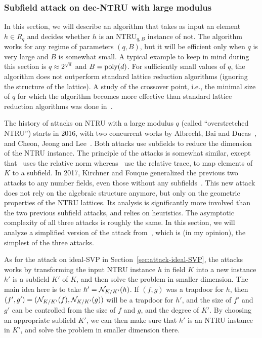 \subsubsection{Subfield attack on dec-NTRU with large modulus}
\label{sec:attack-NTRU}

In this section, we will describe an algorithm that takes as input an element $h \in R_q$ and decides whether $h$ is an NTRU$_{q,B}$ instance of not. The algorithm works for any regime of parameters $(q,B)$, but it will be efficient only when $q$ is very large and $B$ is somewhat small. A typical example to keep in mind during this section is $q \approx 2^{\sqrt{d}}$ and $B = \operatorname{poly}(d)$. For sufficiently small values of $q$, the algorithm does not outperform standard lattice reduction algorithms (ignoring the structure of the lattice). A study of the crossover point, i.e., the minimal size of $q$ for which the algorithm becomes more effective than standard lattice reduction algorithms was done in~\cite{DW21}.

The history of attacks on NTRU with a large modulus $q$ (called ``overstretched NTRU'') starts in 2016, with two concurrent works by Albrecht, Bai and Ducas~\cite{ABD16}, and Cheon, Jeong and Lee~\cite{CJL16}. Both attacks use subfields to reduce the dimension of the NTRU instance. The principle of the attacks is somewhat similar, except that~\cite{ABD16} uses the relative norm whereas~\cite{CJL16} use the relative trace, to map elements of $K$ to a subfield.
In 2017, Kirchner and Fouque generalized the previous two attacks to any number fields, even those without any subfields~\cite{KF17}. This new attack does not rely on the algebraic structure anymore, but only on the geometric properties of the NTRU lattices. Its analysis is significantly more involved than the two previous subfield attacks, and relies on heuristics. The asymptotic complexity of all three attacks is roughly the same.
In this section, we will analyze a simplified version of the attack from~\cite{ABD16}, which is (in my opinion), the simplest of the three attacks.

As for the attack on ideal-SVP in Section~\ref{sec:attack-ideal-SVP}, the attacks works by transforming the input NTRU instance $h$ in field $K$ into a new instance $h'$ is a subfield $K'$ of $K$, and then solve the problem in smaller dimension. The main idea here is to take $h' = \mathcal{N}_{K/K'}(h)$. If $(f,g)$ was a trapdoor for $h$, then $(f', g') = (\mathcal{N}_{K/K'}(f),\mathcal{N}_{K/K'}(g))$ will be a trapdoor for $h'$, and the size of $f'$ and $g'$ can be controlled from the size of $f$ and $g$, and the degree of $K'$. By choosing an appropriate subfield $K'$, we can then make sure that $h'$ is an NTRU instance in $K'$, and solve the problem in smaller dimension there.

